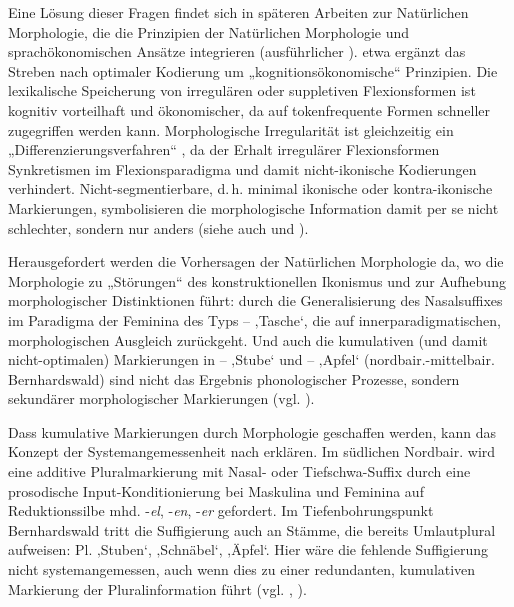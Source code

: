 \begin{sloppypar}
Eine Lösung dieser Fragen findet sich in späteren Arbeiten zur Natürlichen Morphologie, die die Prinzipien der Natürlichen Morphologie und sprachökonomischen Ansätze integrieren (ausführlicher ). \citet{Harnisch1988} etwa ergänzt das Streben nach optimaler Kodierung um „kognitionsökonomische“ Prinzipien. Die lexikalische Speicherung von irregulären oder suppletiven Flexionsformen ist kognitiv vorteilhaft und ökonomischer, da auf tokenfrequente Formen schneller zugegriffen werden kann. Morphologische Irregularität ist gleichzeitig ein „Differenzierungsverfahren“ \citep[185]{Nübling2004}, da der Erhalt irregulärer Flexionsformen Synkretismen im Flexionsparadigma und damit nicht-ikonische Kodierungen verhindert. Nicht-segmentierbare, d.\,h. minimal ikonische oder kontra-ikonische Markierungen, symbolisieren die morphologische Information damit per se nicht schlechter, sondern nur anders (siehe auch \citealt{BybeeNewman1995} und \citealt[379]{Harnisch2000}).
\end{sloppypar}

Herausgefordert werden die Vorhersagen der Natürlichen Morphologie da, wo die Morphologie zu „Störungen“ des konstruktionellen Ikonismus und zur Aufhebung morphologischer Distinktionen führt: durch die Generalisierung des Nasalsuffixes im Paradigma der Feminina des Typs  --  ‚Tasche‘, die auf innerparadigmatischen, morphologischen Ausgleich zurückgeht. Und auch die kumulativen (und damit nicht-optimalen) Markierungen in  --  ‚Stube‘ und  --  ‚Apfel‘ (nordbair.-mittelbair. Bernhardswald) sind nicht das Ergebnis phonologischer Prozesse, sondern sekundärer morphologischer Markierungen (vgl. ).

Dass kumulative Markierungen durch Morphologie geschaffen werden, kann das Konzept der Systemangemessenheit nach \citet{Wurzel1984} erklären. Im südlichen Nordbair. wird eine additive Pluralmarkierung mit Nasal- oder Tiefschwa-Suffix durch eine prosodische Input-Konditionierung bei Maskulina und Feminina auf Reduktionssilbe mhd. -\textit{el}, -\textit{en}, -\textit{er} gefordert. Im Tiefenbohrungspunkt Bernhardswald tritt die Suffigierung auch an Stämme, die bereits Umlautplural aufweisen: Pl.  ‚Stuben‘,  ‚Schnäbel‘,  ‚Äpfel‘. Hier wäre die fehlende Suffigierung nicht systemangemessen, auch wenn dies zu einer redundanten, kumulativen Markierung der Pluralinformation führt (vgl. \citealt[99]{Harnisch2016}, \citealt[43]{Rowley1997}).

